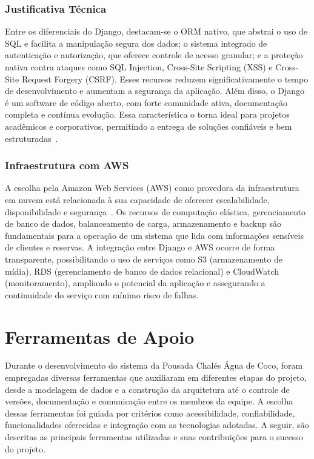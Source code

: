 \documentclass[
	12pt,				%
	openany,			%
	oneside,			%
	a4paper,			%
	english,			%
	french,				%
	spanish,			%
	brazil				%
	]{abntex2}
\begin{document}
\subsubsection{Justificativa Técnica}

Entre os diferenciais do Django, destacam-se o ORM nativo, que abstrai o uso de SQL e facilita a manipulação segura dos dados; o sistema integrado de autenticação e autorização, que oferece controle de acesso granular; e a proteção nativa contra ataques como SQL Injection, Cross-Site Scripting (XSS) e Cross-Site Request Forgery (CSRF). Esses recursos reduzem significativamente o tempo de desenvolvimento e aumentam a segurança da aplicação.
Além disso, o Django é um software de código aberto, com forte comunidade ativa, documentação completa e contínua evolução. Essa característica o torna ideal para projetos acadêmicos e corporativos, permitindo a entrega de soluções confiáveis e bem estruturadas~\cite{django}.

\subsubsection{Infraestrutura com AWS}
A escolha pela Amazon Web Services (AWS) como provedora da infraestrutura em nuvem está relacionada à sua capacidade de oferecer escalabilidade, disponibilidade e segurança~\cite{aws-doc}. Os recursos de computação elástica, gerenciamento de banco de dados, balanceamento de carga, armazenamento e backup são fundamentais para a operação de um sistema que lida com informações sensíveis de clientes e reservas.
A integração entre Django e AWS ocorre de forma transparente, possibilitando o uso de serviços como S3 (armazenamento de mídia), RDS (gerenciamento de banco de dados relacional) e CloudWatch (monitoramento), ampliando o potencial da aplicação e assegurando a continuidade do serviço com mínimo risco de falhas.


\section{Ferramentas de Apoio}
Durante o desenvolvimento do sistema da Pousada Chalés Água de Coco, foram empregadas diversas ferramentas que auxiliaram em diferentes etapas do projeto, desde a modelagem de dados e a construção da arquitetura até o controle de versões, documentação e comunicação entre os membros da equipe. A escolha dessas ferramentas foi guiada por critérios como acessibilidade, confiabilidade, funcionalidades oferecidas e integração com as tecnologias adotadas. A seguir, são descritas as principais ferramentas utilizadas e suas contribuições para o sucesso do projeto.
\end{document}
